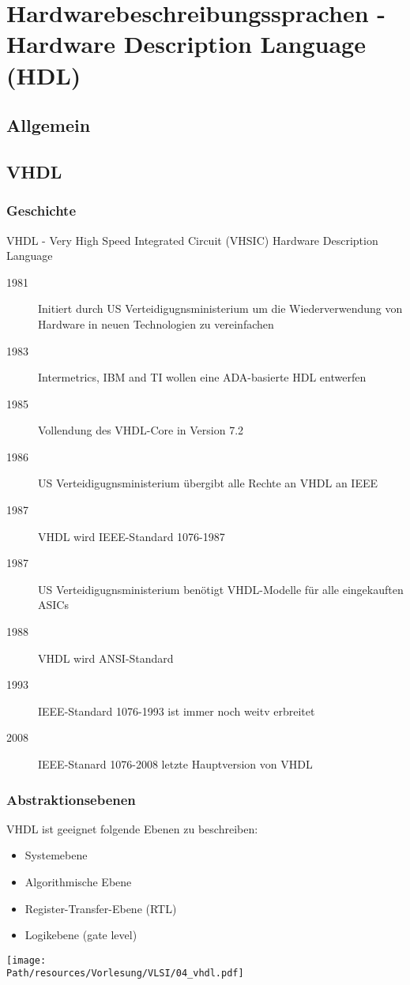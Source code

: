 \chapter{Hardwarebeschreibungssprachen - Hardware Description Language (HDL)}

\section{Allgemein}

\section{VHDL}
	
\subsection{Geschichte}
	VHDL - Very High Speed Integrated Circuit (VHSIC) Hardware Description Language
	
	\begin{description}
		\item[1981] Initiert durch US Verteidigugnsministerium um die Wiederverwendung von Hardware in neuen Technologien zu vereinfachen
		\item[1983] Intermetrics, IBM and TI wollen eine ADA-basierte HDL entwerfen
		\item[1985] Vollendung des VHDL-Core in Version 7.2
		\item[1986] US Verteidigugnsministerium übergibt alle Rechte an VHDL an IEEE
		\item[1987] VHDL wird IEEE-Standard 1076-1987
		\item[1987] US Verteidigugnsministerium benötigt VHDL-Modelle für alle eingekauften ASICs
		\item[1988] VHDL wird ANSI-Standard
		\item[1993] IEEE-Standard 1076-1993 ist immer noch weitv erbreitet
		\item[2008] IEEE-Stanard 1076-2008 letzte Hauptversion von VHDL
	\end{description}
	
\subsection{Abstraktionsebenen}
	VHDL ist geeignet folgende Ebenen zu beschreiben:
	\begin{itemize}
		\item Systemebene
		\item Algorithmische Ebene
		\item Register-Transfer-Ebene (RTL)
		\item Logikebene (gate level)
	\end{itemize}
	\begin{center}
		\texttt{[image: \\Path/resources/Vorlesung/VLSI/04\_vhdl.pdf]}
	\end{center}
	
